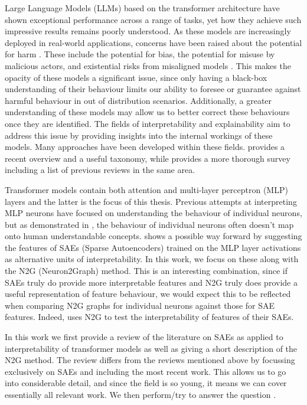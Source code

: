 Large Language Models (LLMs) based on the transformer architecture \parencite{vaswani_attention_2023} have shown exceptional performance across a range of tasks, yet how they achieve such impressive results remains poorly understood.
As these models are increasingly deployed in real-world applications, concerns have been raised about the potential for harm \parencite{noauthor_statement_nodate}\parencite{hendrycks_overview_2023}.
These include the potential for bias, the potential for misuse by malicious actors, and existential risks from misaligned models \parencite{ngo_alignment_2024}.
This makes the opacity of these models a significant issue, since only having a black-box understanding of their behaviour limits our ability to foresee or guarantee against harmful behaviour in out of distribution scenarios.
Additionally, a greater understanding of these models may allow us to better correct these behaviours once they are identified.
The fields of interpretability and explainability aim to address this issue by providing insights into the internal workings of these models.
Many approaches have been developed within these fields.
\textcite{bereska_mechanistic_2024} provides a recent overview and a useful taxonomy, while \textcite{rauker_toward_2023} provides a more thorough survey including a list of previous reviews in the same area.

Transformer models contain both attention and multi-layer perceptron (MLP) layers and the latter is the focus of this thesis.
Previous attempts at interpreting MLP neurons have focused on understanding the behaviour of individual neurons\parencite{wang_interpretability_2022}, but as demonstrated in \textcite{elhage_toy_2022}, the behaviour of individual neurons often doesn't map onto human understandable concepts.
\textcite{bricken_towards_2023} shows a possible way forward by suggesting the features of SAEs (Sparse Autoencoders) trained on the MLP layer activations as alternative units of interpretability.
In this work, we focus on these along with the N2G (Neuron2Graph) \parencite{foote_neuron_2023} method.
This is an interesting combination, since if SAEs truly do provide more interpretable features and N2G truly does provide a useful representation of feature behaviour, we would expect this to be reflected when comparing N2G graphs for individual neurons against those for SAE features.
Indeed, \textcite{gao_scaling_2024} uses N2G to test the interpretability of features of their SAEs.

In this work we first provide a review of the literature on SAEs as applied to interpretability of transformer models as well as giving a short description of the N2G method.
The review differs from the reviews mentioned above by focussing exclusively on SAEs and including the most recent work.
This allows us to go into considerable detail, and since the field is so young, it means we can cover essentially all relevant work.
We then perform/try to answer the question .

